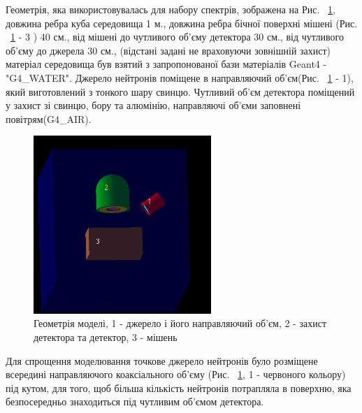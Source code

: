 \documentclass[a4paper, 14pt]{article}
\numberwithin{equation}{section}
\numberwithin{table}{section}
\begin{document}
Геометрія, яка використовувалась для набору спектрів, зображена на Рис. ~\ref{ris:Geometry}, довжина ребра куба середовища 1 м., довжина ребра бічної поверхні мішені (Рис. ~\ref{ris:Geometry} - 3 ) 40 см., від мішені до чутливого об'єму детектора 30 см., від чутливого об'єму до джерела 30 см., (відстані задані не враховуючи зовнішній захист) матеріал середовища був взятий з запропонованої бази матеріалів Geant4 - "G4\_WATER". Джерело нейтронів поміщене в направляючий об'єм(Рис. ~\ref{ris:Geometry} - 1), який виготовлений з тонкого шару свинцю. Чутливий об'єм детектора поміщений у захист зі свинцю, бору та алюмінію, направляючі об'єми заповнені повітрям(G4\_AIR).
\begin{figure}[!hbt]
	\centering \includegraphics[width=0.6\textwidth]{images/geometryAll.png}
	\caption{Геометрія моделі, 1 - джерело і його направляючий об'єм, 2 - захист детектора та детектор, 3 - мішень} 
	\label{ris:Geometry}	
\end{figure}
Для спрощення моделювання точкове джерело нейтронів було розміщене всередині направляючого коаксіального об'єму (Рис. ~\ref{ris:Geometry}, 1 - червоного кольору) під кутом, для того, щоб більша кількість нейтронів потрапляла в поверхню, яка безпосередньо знаходиться під чутливим об'ємом детектора.
\end{document}
